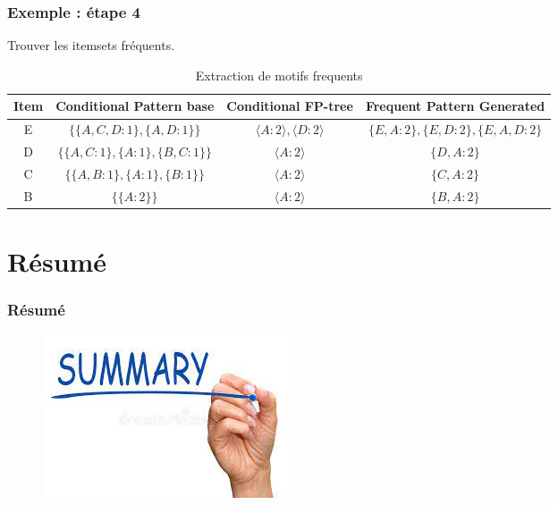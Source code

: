 \documentclass{beamer}
\begin{document}
\frame
{
  \frametitle{Exemple : étape 4 }
Trouver les itemsets fréquents.
    
  			\begin{table}[htp]
			\caption{Extraction de motifs frequents}
			\begin{center}
				\begin{adjustbox}{width=\columnwidth,center}
				\begin{tabular}{|c|c|c|c|}
				\hline
				\textbf{Item} & \textbf{Conditional Pattern base} & \textbf{Conditional FP-tree} & \textbf{Frequent Pattern Generated} \\
				\hline
				E & $\{\{A,C,D:1\},\{A,D:1\}\}$ & 
				$\langle A:2 \rangle,\langle D:2\rangle$ & 
				$\{E,A:2\},\{E,D:2\},\{E,A,D:2\}$  \\
				\hline
				D & $\{\{A,C:1\},\{A:1\},\{B,C:1\}\}$ & 
				$\langle A:2\rangle$ & 
				$\{D,A:2\}$  \\
				\hline
				C & $\{\{A,B:1\},\{A:1\},\{B:1\}\}$ & 
				$\langle A:2\rangle$ & 
				$\{C,A:2\}$  \\
				\hline
				B & $\{\{A:2\}\}$ & 
				$\langle A:2\rangle$ & 
				$\{B,A:2\}$ \\
				\hline
				\end{tabular}
				\end{adjustbox}
			\end{center}
			\label{Base de transactions suivant L}
			\end{table}%
}

\section[Résumé]{Résumé}
\frame
{
\frametitle{Résumé}
\begin{figure}[htbp]
\begin{center}
\includegraphics[scale=0.7]{images/sum.jpeg}
\label{summary}
\end{center}
\end{figure}
}
\end{document}
